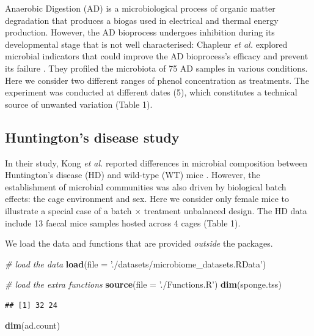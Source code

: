 \documentclass[]{book}
\newenvironment{Shaded}{\begin{snugshade}}{\end{snugshade}}
\newcommand{\KeywordTok}[1]{\textcolor[rgb]{0.13,0.29,0.53}{\textbf{#1}}}
\newcommand{\DataTypeTok}[1]{\textcolor[rgb]{0.13,0.29,0.53}{#1}}
\newcommand{\StringTok}[1]{\textcolor[rgb]{0.31,0.60,0.02}{#1}}
\newcommand{\CommentTok}[1]{\textcolor[rgb]{0.56,0.35,0.01}{\textit{#1}}}
\newcommand{\NormalTok}[1]{#1}
\begin{document}
Anaerobic Digestion (AD) is a microbiological process of organic matter
degradation that produces a biogas used in electrical and thermal energy
production. However, the AD bioprocess undergoes inhibition during its
developmental stage that is not well characterised: Chapleur \emph{et
al.} explored microbial indicators that could improve the AD
bioprocess's efficacy and prevent its failure
\citep{chapleur2016increasing}. They profiled the microbiota of 75 AD
samples in various conditions. Here we consider two different ranges of
phenol concentration as treatments. The experiment was conducted at
different dates (5), which constitutes a technical source of unwanted
variation (Table 1).

\subsection{Huntington's disease study}\label{huntingtons-disease-study}

In their study, Kong \emph{et al.} reported differences in microbial
composition between Huntington's disease (HD) and wild-type (WT) mice
\citep{kong2018microbiome}. However, the establishment of microbial
communities was also driven by biological batch effects: the cage
environment and sex. Here we consider only female mice to illustrate a
special case of a batch \(\times\) treatment unbalanced design. The HD
data include 13 faecal mice samples hosted across 4 cages (Table 1).

We load the data and functions that are provided \emph{outside} the
packages.

\begin{Shaded}
\begin{Highlighting}[]
\CommentTok{# load the data}
\KeywordTok{load}\NormalTok{(}\DataTypeTok{file =} \StringTok{'./datasets/microbiome_datasets.RData'}\NormalTok{)}

\CommentTok{# load the extra functions}
\KeywordTok{source}\NormalTok{(}\DataTypeTok{file =} \StringTok{'./Functions.R'}\NormalTok{)}
\KeywordTok{dim}\NormalTok{(sponge.tss)}
\end{Highlighting}
\end{Shaded}

\begin{verbatim}
## [1] 32 24
\end{verbatim}

\begin{Shaded}
\begin{Highlighting}[]
\KeywordTok{dim}\NormalTok{(ad.count)}
\end{Highlighting}
\end{Shaded}
\end{document}
